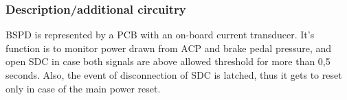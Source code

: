 
\subsubsection{Description/additional circuitry}

BSPD is represented by a PCB with an on-board current transducer. It’s function is to monitor
power drawn from ACP and brake pedal pressure, and open SDC in case both signals are above
allowed threshold for more than 0,5 seconds. Also, the event of disconnection of SDC is latched,
thus it gets to reset only in case of the main power reset.



